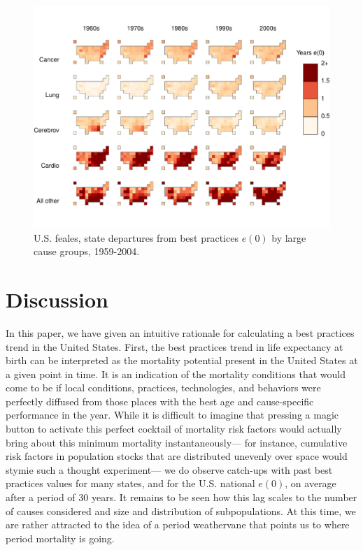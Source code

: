 \documentclass[11pt,oneside,a4paper]{article} %
\begin{document}
\begin{figure}
\centering
\caption{U.S. feales, state departures from best practices $e(0)$ by large cause
groups, 1959-2004.}
\label{fig:depf}
\includegraphics[scale=0.7]{Figures/StatesDecadesF.pdf}
\end{figure}

\FloatBarrier
\section*{Discussion}
In this paper, we have given an intuitive rationale for calculating a best
practices trend in the United States. First, the best practices trend in life
expectancy at birth can be interpreted as the mortality potential present in the
United States at a given point in time. It is an indication of the mortality
conditions that would come to be if local conditions, practices,
technologies, and behaviors were perfectly diffused from those places with the
best age and cause-specific performance in the year. While it is difficult to
imagine that pressing a magic button to activate this perfect cocktail of
mortality risk factors would actually bring about this minimum mortality
instantaneously--- for instance, cumulative risk factors in population
stocks that are distributed unevenly over space would stymie such a thought
experiment--- we do observe catch-ups with past best practices values for many states, and for the
U.S. national $e(0)$, on average after a period of 30 years. It remains to be
seen how this lag scales to the number of causes considered and size and
distribution of subpopulations. At this time, we are rather attracted to the
idea of a period weathervane that points us to where period mortality is going.


%
\end{document}
